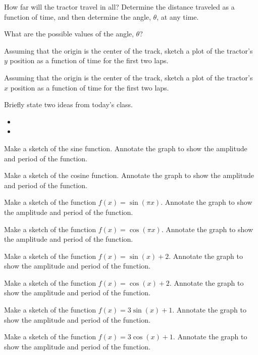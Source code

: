 \begin{problem}
  \begin{subproblem}
  \item How far will the tractor travel in all? Determine the distance
    traveled as a function of time, and then determine the angle,
    $\theta$, at any time.
    \vfill
  \item What are the possible values of the angle, $\theta$?
    \vspace{1em}
  \item Assuming that the origin is the center of the track, sketch a
    plot of the tractor's $y$ position as a function of time for the
    first two laps.
    \vfill
  \item Assuming that the origin is the center of the track, sketch a
    plot of the tractor's $x$ position as a function of time for the
    first two laps.
    \vfill
  \end{subproblem}
\end{problem}

\postClass

\begin{problem}
\item Briefly state two ideas from today's class.
  \begin{itemize}
  \item
  \item
  \end{itemize}
\item Make a sketch of the sine function. Annotate the graph to show
  the amplitude and period of the function.
\item Make a sketch of the cosine function. Annotate the graph to show
  the amplitude and period of the function.
\item Make a sketch of the function $f(x)=\sin(\pi x)$. Annotate the
  graph to show the amplitude and period of the function.
\item Make a sketch of the function $f(x)=\cos(\pi x)$. Annotate the
  graph to show the amplitude and period of the function.
\item Make a sketch of the function $f(x)=\sin(x)+2$. Annotate the
  graph to show the amplitude and period of the function.
\item Make a sketch of the function $f(x)=\cos(x)+2$. Annotate the
  graph to show the amplitude and period of the function.
\item Make a sketch of the function $f(x)=3\sin(x)+1$. Annotate the
  graph to show the amplitude and period of the function.
\item Make a sketch of the function $f(x)=3\cos(x)+1$. Annotate the
  graph to show the amplitude and period of the function.
\end{problem}


